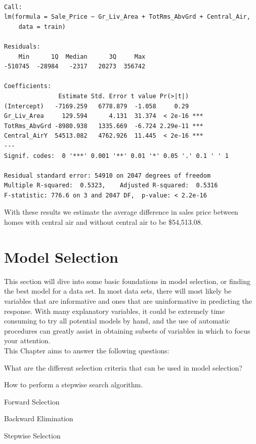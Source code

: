 \documentclass[
  letterpaper,
  DIV=11,
  numbers=noendperiod]{scrreprt}
\begin{document}
\begin{verbatim}

Call:
lm(formula = Sale_Price ~ Gr_Liv_Area + TotRms_AbvGrd + Central_Air, 
    data = train)

Residuals:
    Min      1Q  Median      3Q     Max 
-510745  -28984   -2317   20273  356742 

Coefficients:
               Estimate Std. Error t value Pr(>|t|)    
(Intercept)   -7169.259   6778.879  -1.058     0.29    
Gr_Liv_Area     129.594      4.131  31.374  < 2e-16 ***
TotRms_AbvGrd -8980.938   1335.669  -6.724 2.29e-11 ***
Central_AirY  54513.082   4762.926  11.445  < 2e-16 ***
---
Signif. codes:  0 '***' 0.001 '**' 0.01 '*' 0.05 '.' 0.1 ' ' 1

Residual standard error: 54910 on 2047 degrees of freedom
Multiple R-squared:  0.5323,    Adjusted R-squared:  0.5316 
F-statistic: 776.6 on 3 and 2047 DF,  p-value: < 2.2e-16
\end{verbatim}

With these results we estimate the average difference in sales price
between homes with central air and without central air to be
\$54,513.08.


\hypertarget{sec-sel}{%
\chapter{Model Selection}\label{sec-sel}}

This section will dive into some basic foundations in model selection,
or finding the best model for a data set. In most data sets, there will
most likely be variables that are informative and ones that are
uninformative in predicting the response. With many explanatory
variables, it could be extremely time consuming to try all potential
models by hand, and the use of automatic procedures can greatly assist
in obtaining subsets of variables in which to focus your attention.\\

This Chapter aims to answer the following questions:

What are the different selection criteria that can be used in model
selection?

How to perform a stepwise search algorithm.

Forward Selection

Backward Elimination

Stepwise Selection
\end{document}
